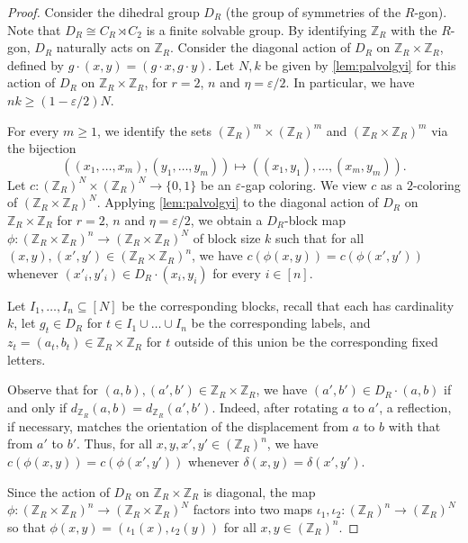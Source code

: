 \documentclass[10pt,a4paper]{amsart}
\begin{document}
\begin{proof}
    Consider the dihedral group $D_R$ (the group of symmetries of the $R$-gon). 
    Note that $D_R \cong C_R \rtimes C_2$ is a finite solvable group.
    By identifying $\mathbb{Z}_R$ with the $R$-gon, $D_R$ naturally acts on $\mathbb{Z}_R$.
    Consider the diagonal action of $D_R$ on $\mathbb{Z}_R \times \mathbb{Z}_R$, defined by $g \cdot (x, y) = (g \cdot x, g \cdot y)$.
    Let $N, k$ be given by \cref{lem:palvolgyi} for this action of $D_R$ on $\mathbb{Z}_R \times \mathbb{Z}_R$, for $r=2$, $n$ and $\eta = \varepsilon/2$.
    In particular, we have $nk \geq (1-\varepsilon/2)N$.
    
    For every $m \geq 1$, we identify the sets $(\mathbb{Z}_R)^m \times (\mathbb{Z}_R)^m$ and $(\mathbb{Z}_R \times \mathbb{Z}_R)^m$ via the bijection \[((x_1, \ldots, x_m), (y_1, \ldots, y_m)) \mapsto ((x_1, y_1), \ldots, (x_m, y_m)).\]
    Let $c : (\mathbb{Z}_R)^N \times (\mathbb{Z}_R)^N \to \{0, 1\}$ be an $\varepsilon$-gap coloring.
    We view $c$ as a $2$-coloring of $(\mathbb{Z}_R \times \mathbb{Z}_R)^N$.
    Applying \cref{lem:palvolgyi} to the diagonal action of $D_R$ on $\mathbb{Z}_R \times \mathbb{Z}_R$ for $r=2$, $n$ and $\eta = \varepsilon/2$, we obtain a $D_R$-block map $\phi : (\mathbb{Z}_R \times \mathbb{Z}_R)^n \to (\mathbb{Z}_R \times \mathbb{Z}_R)^N$ of block size $k$ such that for all $(x, y), (x', y') \in (\mathbb{Z}_R \times \mathbb{Z}_R)^n$, we have $c(\phi(x, y)) = c(\phi(x', y'))$ whenever $(x'_i, y'_i) \in D_{R} \cdot (x_i, y_i)$ for every $i \in [n]$.
    
    Let $I_1, \ldots, I_n \subseteq [N]$ be the corresponding blocks, recall that each has cardinality $k$, let $g_{t} \in D_R$ for $t \in I_1 \cup \ldots \cup I_n$ be the corresponding labels, and $z_{t} = (a_t, b_t) \in \mathbb{Z}_R \times \mathbb{Z}_R$ for $t$ outside of this union be the corresponding fixed letters.
    
    Observe that for $(a, b), (a', b') \in \mathbb{Z}_R \times \mathbb{Z}_R$, we have $(a', b') \in D_R \cdot (a, b)$ if and only if $d_{\mathbb{Z}_R}(a, b) = d_{\mathbb{Z}_R}(a', b')$.
    Indeed, after rotating $a$ to $a'$, a reflection, if necessary, matches the orientation of the displacement from $a$ to $b$ with that from $a'$ to $b'$.
    Thus, for all $x, y, x', y' \in (\mathbb{Z}_R)^n$, we have $c(\phi(x, y)) = c(\phi(x', y'))$ whenever $\delta(x, y) = \delta(x', y')$.
    
    Since the action of $D_R$ on $\mathbb{Z}_R \times \mathbb{Z}_R$ is diagonal, the map $\phi : (\mathbb{Z}_R \times \mathbb{Z}_R)^n \to (\mathbb{Z}_R \times \mathbb{Z}_R)^N$ factors into two maps $\iota_1, \iota_2 : (\mathbb{Z}_R)^n \to (\mathbb{Z}_R)^N$ so that $\phi(x, y) = (\iota_1(x), \iota_2(y))$ for all $x, y \in (\mathbb{Z}_R)^n$.
    

\end{proof}
\end{document}
